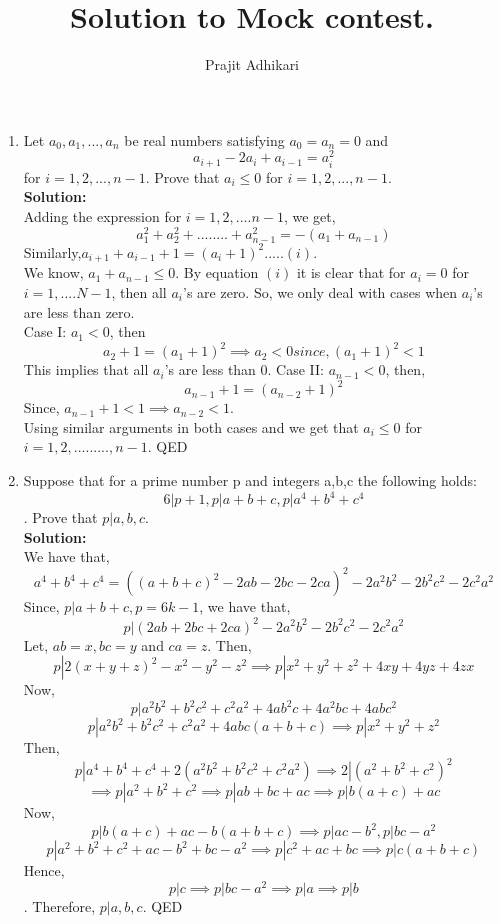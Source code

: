 \documentclass{article}
\begin{document}
\title{Solution to Mock contest.}
\author{Prajit Adhikari}
\maketitle

\begin{enumerate}
\item Let $a_0,a_1,...,a_n$ be real numbers satisfying $a_0 = a_n = 0$ and $$a_{i+1} -2a_{i} + a_{i-1} = a_{i}^2$$ for $i = 1,2,...,n -1$. Prove that $a_i \leq 0$ for $i = 1,2,..., n-1$.\\
    \textbf{Solution:}\\
    Adding the expression for $i=1,2,....n-1$, we get,
    $$ a_1^2+a_2^2+........+a_{n-1}^2 = -(a_1+a_{n-1}) $$
    Similarly,$a_{i+1}+a_{i-1}+1=(a_i+1)^2.....(i)$.\\
    We know, $a_1+a_{n-1} \leq 0$. By equation $(i)$ it is clear that for $a_i=0$ for $i=1,....N-1$, then all $a_i$'s are zero. So, we only deal with cases when $a_i$'s are less than zero.\\
    Case I: $a_1 < 0$, then
    $$a_2+1= (a_1+1)^2 \implies a_2 <0 since, (a_1+1)^2<1$$
    This implies that all $a_i$'s are less than 0.
    Case II: $a_{n-1}<0$, then,
    $$ a_{n-1}+1 = (a_{n-2}+1)^2$$
    Since, $a_{n-1}+1 < 1 \implies a_{n-2}<1$. \\
    Using similar arguments in both cases and  we get that $a_i\leq 0$ for $i=1,2,.........,n-1$. QED
    
    \newpage
    
    \item  Suppose that for a prime number p and integers a,b,c the following holds: $$6 | p + 1, p | a + b + c, p | a^4 + b^4 + c^4$$. Prove that $p | a,b,c$.\\
    \textbf{Solution:}\\
    We have that,
    $$a^4+b^4+c^4 = ((a+b+c)^2-2ab-2bc-2ca)^2-2a^2b^2-2b^2c^2-2c^2a^2$$
    Since, $p|a+b+c, p=6k-1$, we have that,
    $$p|(2ab+2bc+2ca)^2-2a^2b^2-2b^2c^2-2c^2a^2$$
    Let, $ab=x,bc=y$ and $ca=z$. Then,
    $$p|2(x+y+z)^2-x^2-y^2-z^2\implies p|x^2+y^2+z^2+4xy+4yz+4zx$$
    Now,
    $$ p|a^2b^2+b^2c^2+c^2a^2+4ab^2c+4a^2bc+4abc^2$$
    $$p|a^2b^2+b^2c^2+c^2a^2+4abc(a+b+c) \implies p|x^2+y^2+z^2$$
    Then,
    $$p|a^4+b^4+c^4+2(a^2b^2+b^2c^2+c^2a^2) \implies 2|(a^2+b^2+c^2)^2$$
    $$\implies p|a^2+b^2+c^2 \implies p|ab+bc+ac \implies p|b(a+c)+ac$$
    Now,
    $$p|b(a+c)+ac-b(a+b+c) \implies p|ac-b^2, p|bc-a^2$$
    $$p|a^2+b^2+c^2+ac-b^2+bc-a^2 \implies p|c^2+ac+bc \implies p|c(a+b+c)$$
    Hence, $$p|c \implies p|bc-a^2 \implies p|a \implies p|b$$.
    Therefore, $p|a,b,c$. QED
    

\end{enumerate}
\end{document}
